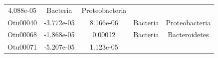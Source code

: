 \documentclass[]{article}
\begin{document}
\begin{longtable}[]{@{}ccccc@{}}
\begin{minipage}[t]{0.14\columnwidth}
4.088e-05\strut
\end{minipage} & \begin{minipage}[t]{0.13\columnwidth}\centering\strut
Bacteria\strut
\end{minipage} & \begin{minipage}[t]{0.27\columnwidth}\centering\strut
Proteobacteria\strut
\end{minipage}\tabularnewline
\begin{minipage}[t]{0.13\columnwidth}\centering\strut
Otu00040\strut
\end{minipage} & \begin{minipage}[t]{0.16\columnwidth}\centering\strut
-3.772e-05\strut
\end{minipage} & \begin{minipage}[t]{0.14\columnwidth}\centering\strut
8.166e-06\strut
\end{minipage} & \begin{minipage}[t]{0.13\columnwidth}\centering\strut
Bacteria\strut
\end{minipage} & \begin{minipage}[t]{0.27\columnwidth}\centering\strut
Proteobacteria\strut
\end{minipage}\tabularnewline
\begin{minipage}[t]{0.13\columnwidth}\centering\strut
Otu00068\strut
\end{minipage} & \begin{minipage}[t]{0.16\columnwidth}\centering\strut
-1.868e-05\strut
\end{minipage} & \begin{minipage}[t]{0.14\columnwidth}\centering\strut
0.00012\strut
\end{minipage} & \begin{minipage}[t]{0.13\columnwidth}\centering\strut
Bacteria\strut
\end{minipage} & \begin{minipage}[t]{0.27\columnwidth}\centering\strut
Bacteroidetes\strut
\end{minipage}\tabularnewline
\begin{minipage}[t]{0.13\columnwidth}\centering\strut
Otu00071\strut
\end{minipage} & \begin{minipage}[t]{0.16\columnwidth}\centering\strut
-5.207e-05\strut
\end{minipage} & \begin{minipage}[t]{0.14\columnwidth}\centering\strut
1.123e-05\strut
\end{minipage} & \begin{minipage}[t]{0.13\columnwidth}\centering\strut

\end{minipage}
\end{longtable}
\end{document}
